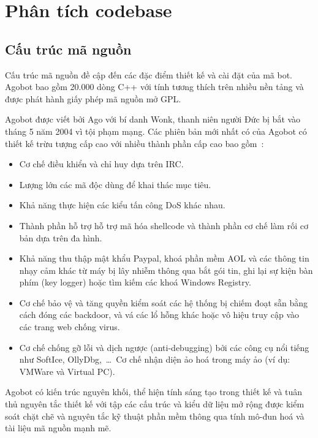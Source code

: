 
\chapter{Phân tích codebase}\label{ch:codebase}

\section{Cấu trúc mã nguồn}

Cấu trúc mã nguồn đề cập đến các đặc điểm thiết kế và cài đặt của mã bot.
Agobot bao gồm 20.000 dòng C++ với tính tương thích trên nhiều nền tảng và
được phát hành giấy phép mã nguồn mở GPL\@.

Agobot được viết bởi Ago với bí danh Wonk,
thanh niên người Đức bị bắt vào tháng 5 năm 2004 vì tội phạm mạng.
Các phiên bản mới nhất có của Agobot có thiết kế trừu tượng cấp cao với
nhiều thành phần cấp cao bao gồm~\cite{inside,honeynet53}:

\begin{itemize}
\item Cơ chế điều khiển và chỉ huy dựa trên IRC\@.
\item Lượng lớn các mã độc dùng để khai thác mục tiêu.
\item Khả năng thực hiện các kiểu tấn công DoS khác nhau.
\item Thành phần hỗ trợ hỗ trợ mã hóa shellcode và thành phần cơ chế làm rối cơ bản dựa trên đa hình.
\item Khả năng thu thập mật khẩu Paypal,
	khoá phần mềm AOL và các thông tin nhạy cảm khác từ máy bị lây nhiễm thông qua bắt gói tin,
	ghi lại sự kiện bàn phím (key logger) hoặc tìm kiếm các khoá Windows Registry.
\item Cơ chế bảo vệ và tăng quyền kiểm soát các hệ thống bị chiếm đoạt sẵn bằng cách đóng các backdoor,
	và vá các lổ hỗng khác hoặc vô hiệu truy cập vào các trang web chống virus.
\item Cơ chế chống gỡ lỗi và dịch ngược (anti-debugging) bởi các công cụ nổi tiếng như
	SoftIce, OllyDbg,~\dots~Cơ chế nhận diện ảo hoá trong máy ảo (ví dụ: VMWare và Virtual PC).
\end{itemize}

Agobot có kiến trúc nguyên khối,
thể hiện tính sáng tạo trong thiết kế và tuân thủ nguyên tắc thiết kế với tập các cấu trúc và
kiểu dữ liệu mở rộng được kiểm soát chặt chẽ và nguyên tắc kỹ thuật phần mềm thông qua tính
mô-đun hoá và tài liệu mã nguồn mạnh mẽ.

